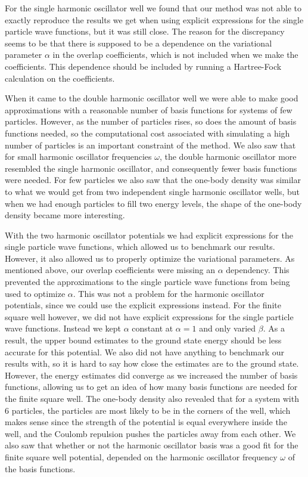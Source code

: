 \documentclass[../main.tex]{subfiles}
\begin{document}
For the single harmonic oscillator well we found that our method was not able to exactly reproduce the results we get when using explicit expressions for the single particle wave functions, but it was still close. The reason for the discrepancy seems to be that there is supposed to be a dependence on the variational parameter $\alpha$ in the overlap coefficients, which is not included when we make the coefficients. This dependence should be included by running a Hartree-Fock calculation on the coefficients.

When it came to the double harmonic oscillator well we were able to make good approximations with a reasonable number of basis functions for systems of few particles. However, as the number of particles rises, so does the amount of basis functions needed, so the computational cost associated with simulating a high number of particles is an important constraint of the method. We also saw that for small harmonic oscillator frequencies $\omega$, the double harmonic oscillator more resembled the single harmonic oscillator, and consequently fewer basis functions were needed. For few particles we also saw that the one-body density was similar to what we would get from two independent single harmonic oscillator wells, but when we had enough particles to fill two energy levels, the shape of the one-body density became more interesting.

With the two harmonic oscillator potentials we had explicit expressions for the single particle wave functions, which allowed us to benchmark our results. However, it also allowed us to properly optimize the variational parameters. As mentioned above, our overlap coefficients were missing an $\alpha$ dependency. This prevented the approximations to the single particle wave functions from being used to optimize $\alpha$. This was not a problem for the harmonic oscillator potentials, since we could use the explicit expressions instead. For the finite square well however, we did not have explicit expressions for the single particle wave functions. Instead we kept $\alpha$ constant at $\alpha = 1$ and only varied $\beta$. As a result, the upper bound estimates to the ground state energy should be less accurate for this potential. We also did not have anything to benchmark our results with, so it is hard to say how close the estimates are to the ground state. However, the energy estimates did converge as we increased the number of basis functions, allowing us to get an idea of how many basis functions are needed for the finite square well. The one-body density also revealed that for a system with $6$ particles, the particles are most likely to be in the corners of the well, which makes sense since the strength of the potential is equal everywhere inside the well, and the Coulomb repulsion pushes the particles away from each other. We also saw that whether or not the harmonic oscillator basis was a good fit for the finite square well potential, depended on the harmonic oscillator frequency $\omega$ of the basis functions.
\end{document}
